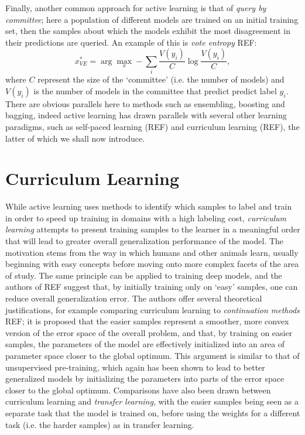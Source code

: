 Finally, another common approach for active learning is that of \textit{query by committee}; here a population of different models are trained on an initial training set, then the samples about which the models exhibit the most disagreement in their predictions are queried. An example of this is \textit{vote entropy} REF:
\begin{equation}
x_{VE}^{*} = \arg\max_{x} - \sum_{i} \frac{V(y_i)}{C} \log \frac{V(y_i)}{C},
\end{equation}
where $C$ represent the size of the `committee' (i.e. the number of models) and $V(y_i)$ is the number of models in the committee that predict predict label $y_i$. There are obvious parallels here to methods such as ensembling, boosting and bagging, indeed active learning has drawn parallels with several other learning paradigms, such as self-paced learning (REF) and curriculum learning (REF), the latter of which we shall now introduce. 

\section{Curriculum Learning}
While active learning uses methods to identify which samples to label and train in order to speed up training in domains with a high labeling cost, \textit{curriculum learning} attempts to present training samples to the learner in a meaningful order that will lead to greater overall generalization performance of the model. The motivation stems from the way in which humans and other animals  learn, usually beginning with easy concepts before moving onto more complex facets of the area of study. The same principle can be applied to training deep models, and the authors of REF suggest that, by initially training only on `easy' samples, one can reduce overall generalization error. The authors offer several theoretical justifications, for example comparing curriculum learning to \textit{continuation methods} REF;  it is proposed that the easier samples represent a smoother, more convex version of the error space of the overall problem, and that, by training on easier samples, the parameters of the model are effectively initialized into an area of parameter space closer to the global optimum. This argument is similar to that of unsupervised pre-training, which again has been shown to lead to better generalized models by initializing the parameters into parts of the error space closer to the global optimum. Comparisons have also been drawn between curriculum learning and \textit{transfer learning}, with the easier samples being seen as a separate task that the model is trained on, before using the weights for a different task (i.e. the harder samples) as in transfer learning.  

